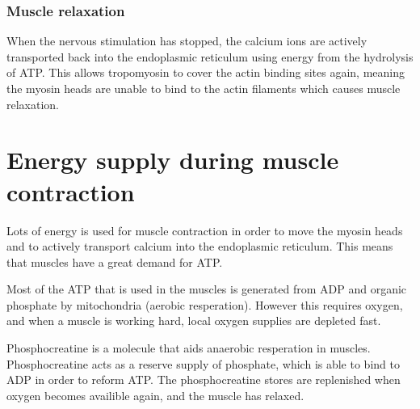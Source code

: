 \documentclass{article}
\begin{document}
\subsubsection*{Muscle relaxation}

When the nervous stimulation has stopped, the calcium ions are actively
transported back into the endoplasmic reticulum using energy from the hydrolysis
of ATP. This allows tropomyosin to cover the actin binding sites again, meaning
the myosin heads are unable to bind to the actin  filaments which causes muscle
relaxation.

\section*{Energy supply during muscle contraction}

Lots of energy is used for muscle contraction in order to move the myosin heads
and to actively transport calcium into the endoplasmic reticulum. This means
that muscles have a great demand for ATP.

Most of the ATP that is used in the muscles is generated from ADP and organic
phosphate by mitochondria (aerobic resperation). However this requires oxygen,
and when a muscle is working hard, local oxygen supplies are depleted fast.

Phosphocreatine is a molecule that aids anaerobic resperation in muscles.
Phosphocreatine acts as a reserve supply of phosphate, which is able to bind to
ADP in order to reform ATP. The phosphocreatine stores are replenished when
oxygen becomes availible again, and the muscle has relaxed.
\end{document}

